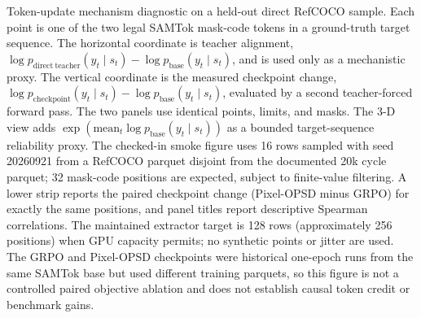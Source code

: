 Token-update mechanism diagnostic on a held-out direct RefCOCO sample.  Each point is one of the two legal
SAMTok mask-code tokens in a ground-truth target sequence.  The horizontal coordinate is teacher alignment,
$\log p_{\mathrm{direct\ teacher}}(y_t\mid s_t)-\log p_{\mathrm{base}}(y_t\mid s_t)$, and is used only as a
mechanistic proxy.  The vertical coordinate is the measured checkpoint change,
$\log p_{\mathrm{checkpoint}}(y_t\mid s_t)-\log p_{\mathrm{base}}(y_t\mid s_t)$, evaluated by a second
teacher-forced forward pass.  The two panels use identical points, limits, and masks.  The 3-D view adds
$\exp(\mathrm{mean}_t\log p_{\mathrm{base}}(y_t\mid s_t))$ as a bounded target-sequence reliability proxy.
The checked-in smoke figure uses 16 rows sampled with seed 20260921 from a RefCOCO parquet disjoint from the documented 20k
cycle parquet; 32 mask-code positions are expected, subject to finite-value filtering.  A lower strip reports the paired
checkpoint change (Pixel-OPSD minus GRPO) for exactly the same positions, and panel titles report descriptive Spearman
correlations.  The maintained extractor target is 128 rows (approximately 256 positions) when GPU capacity permits;
no synthetic points or jitter are used.  The GRPO and Pixel-OPSD
checkpoints were historical one-epoch runs from the same SAMTok base but used different training parquets, so this
figure is not a controlled paired objective ablation and does not establish causal token credit or benchmark gains.
